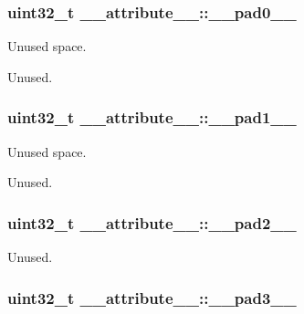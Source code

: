 \subsubsection[{\texorpdfstring{\+\_\+\+\_\+pad0\+\_\+\+\_\+}{__pad0__}}]{\setlength{\rightskip}{0pt plus 5cm}uint32\+\_\+t \+\_\+\+\_\+attribute\+\_\+\+\_\+\+::\+\_\+\+\_\+pad0\+\_\+\+\_\+}\hypertarget{struct____attribute_____a02ee404618bb2bb7a588a4ad5927894d}{}\label{struct____attribute_____a02ee404618bb2bb7a588a4ad5927894d}


Unused space. 

Unused. 
\subsubsection[{\texorpdfstring{\+\_\+\+\_\+pad1\+\_\+\+\_\+}{__pad1__}}]{\setlength{\rightskip}{0pt plus 5cm}uint32\+\_\+t \+\_\+\+\_\+attribute\+\_\+\+\_\+\+::\+\_\+\+\_\+pad1\+\_\+\+\_\+}\hypertarget{struct____attribute_____a0c4e6e1eb99bec0a27a70420f40ac211}{}\label{struct____attribute_____a0c4e6e1eb99bec0a27a70420f40ac211}


Unused space. 

Unused. 
\subsubsection[{\texorpdfstring{\+\_\+\+\_\+pad2\+\_\+\+\_\+}{__pad2__}}]{\setlength{\rightskip}{0pt plus 5cm}uint32\+\_\+t \+\_\+\+\_\+attribute\+\_\+\+\_\+\+::\+\_\+\+\_\+pad2\+\_\+\+\_\+}\hypertarget{struct____attribute_____a2d8f39dfa819e39b227d2790c26409d2}{}\label{struct____attribute_____a2d8f39dfa819e39b227d2790c26409d2}


Unused. 

\subsubsection[{\texorpdfstring{\+\_\+\+\_\+pad3\+\_\+\+\_\+}{__pad3__}}]{\setlength{\rightskip}{0pt plus 5cm}uint32\+\_\+t \+\_\+\+\_\+attribute\+\_\+\+\_\+\+::\+\_\+\+\_\+pad3\+\_\+\+\_\+}\hypertarget{struct____attribute_____a898a0c6c6d94ece9275b1379d2d24f60}{}\label{struct____attribute_____a898a0c6c6d94ece9275b1379d2d24f60}


